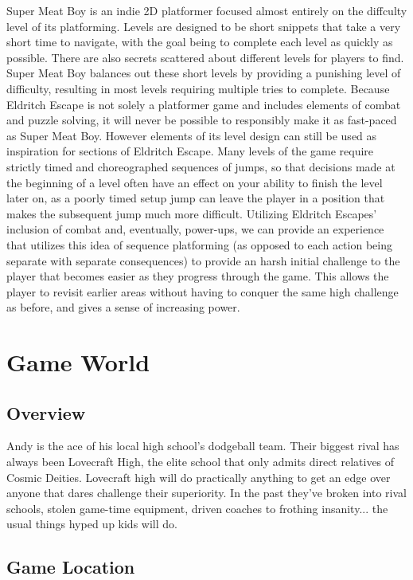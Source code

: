 \documentclass [12pt]{article}
\begin{document}
Super Meat Boy is an indie 2D platformer focused almost entirely on the diffculty level of its platforming. Levels are designed to be short snippets that take a very short time to navigate, with the goal being to complete each level as quickly as possible. There are also secrets scattered about different levels for players to find. Super Meat Boy balances out these short levels by providing a punishing level of difficulty, resulting in most levels requiring multiple tries to complete. Because Eldritch Escape is not solely a platformer game and includes elements of combat and puzzle solving, it will never be possible to responsibly make it as fast-paced as Super Meat Boy. However elements of its level design can still be used as inspiration for sections of Eldritch Escape. Many levels of the game require strictly timed and choreographed sequences of jumps, so that decisions made at the beginning of a level often have an effect on your ability to finish the level later on, as a poorly timed setup jump can leave the player in a position that makes the subsequent jump much more difficult. Utilizing Eldritch Escapes' inclusion of combat and, eventually, power-ups, we can provide an experience that utilizes this idea of sequence platforming (as opposed to each action being separate with separate consequences) to provide an harsh initial challenge to the player that becomes easier as they progress through the game. This allows the player to revisit earlier areas without having to conquer the same high challenge as before, and gives a sense of increasing power.


\section*{Game World}

\subsection*{Overview}

Andy is the ace of his local high school's dodgeball team. Their biggest rival has always been Lovecraft High, the elite school that only admits direct relatives of Cosmic Deities. Lovecraft high will do practically anything to get an edge over anyone that dares challenge their superiority. In the past they've broken into rival schools, stolen game-time equipment, driven coaches to frothing insanity... the usual things hyped up kids will do.

\subsection*{Game Location}
\end{document}
